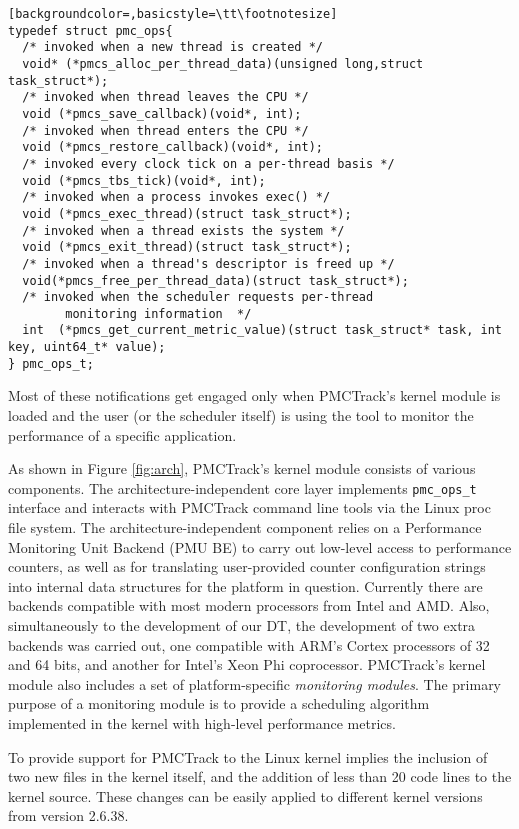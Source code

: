 \begin{lstlisting}[backgroundcolor=,basicstyle=\tt\footnotesize]
typedef struct pmc_ops{
  /* invoked when a new thread is created */
  void* (*pmcs_alloc_per_thread_data)(unsigned long,struct task_struct*);
  /* invoked when thread leaves the CPU */
  void (*pmcs_save_callback)(void*, int);
  /* invoked when thread enters the CPU */
  void (*pmcs_restore_callback)(void*, int);
  /* invoked every clock tick on a per-thread basis */
  void (*pmcs_tbs_tick)(void*, int);
  /* invoked when a process invokes exec() */
  void (*pmcs_exec_thread)(struct task_struct*);
  /* invoked when a thread exists the system */
  void (*pmcs_exit_thread)(struct task_struct*);
  /* invoked when a thread's descriptor is freed up */
  void(*pmcs_free_per_thread_data)(struct task_struct*);
  /* invoked when the scheduler requests per-thread
        monitoring information  */
  int  (*pmcs_get_current_metric_value)(struct task_struct* task, int key, uint64_t* value);
} pmc_ops_t;
\end{lstlisting}

Most of these notifications get engaged only when PMCTrack's kernel
module is loaded and the user (or the scheduler itself) is using the
tool to monitor the performance of a specific application.

As shown in Figure \ref{fig:arch}, PMCTrack's kernel module consists of
various components. The architecture-independent core layer implements
\texttt{pmc\_ops\_t} interface and interacts with PMCTrack command line
tools via the Linux proc file system. The architecture-independent
component relies on a Performance Monitoring Unit Backend (PMU BE) to
carry out low-level access to performance counters, as well as for
translating user-provided counter configuration strings into internal
data structures for the platform in question. Currently there are
backends compatible with most modern processors from Intel and AMD.
Also, simultaneously to the development of our DT, the development of
two extra backends was carried out, one compatible with ARM's Cortex
processors of 32 and 64 bits, and another for Intel's Xeon Phi
coprocessor. PMCTrack's kernel module also includes a set of
platform-specific \textit{monitoring modules}. The primary purpose of a
monitoring module is to provide a scheduling algorithm implemented in
the kernel with high-level performance metrics.

To provide support for PMCTrack to the Linux kernel implies the
inclusion of two new files in the kernel itself, and the addition of
less than 20 code lines to the kernel source. These changes can be
easily applied to different kernel versions from version 2.6.38.

